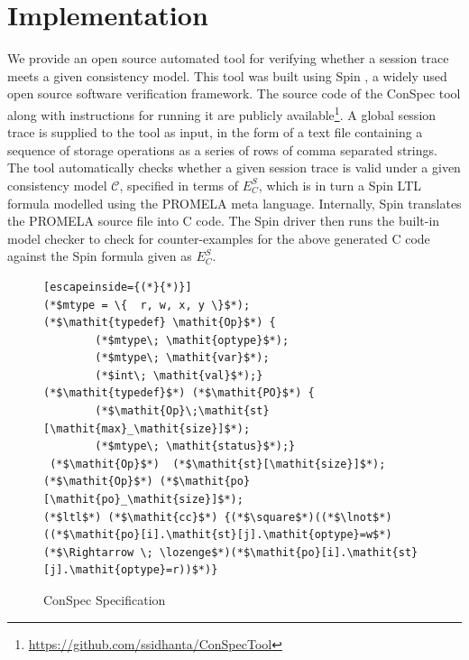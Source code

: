 \documentclass[journal,compsoc]{IEEEtran}
\begin{document}
   \section{Implementation}\label{sec:impl}
 We provide an open source automated  tool for verifying whether a session trace meets a given consistency model. This tool was built using Spin \cite{Holzmann:2003:SMC:1405716}, a widely used open source software verification framework. The source code of the ConSpec tool along with instructions for running it are publicly available\footnote{\url{https://github.com/ssidhanta/ConSpecTool}}. A global session trace is supplied to the tool as input, in the form of a text file containing a sequence of storage operations as a series of rows of comma separated strings. The tool automatically checks whether a given session trace is valid under a given consistency model $\mathcal{C}$, specified in terms of  $E^S_C$, which is in turn a Spin LTL formula modelled using the PROMELA meta language.
  Internally, Spin translates the PROMELA source file into C code. The Spin driver then runs the built-in model checker to check for counter-examples for the above generated C code  against  the Spin formula given as $E^S_C$. %
   \begin{figure}\caption{ConSpec Specification}\label{format:spec}
\begin{lstlisting}[escapeinside={(*}{*)}]
(*$mtype = \{  r, w, x, y \}$*);
(*$\mathit{typedef} \mathit{Op}$*) {
		(*$mtype\; \mathit{optype}$*);
		(*$mtype\; \mathit{var}$*);
		(*$int\; \mathit{val}$*);}
(*$\mathit{typedef}$*) (*$\mathit{PO}$*) {
		(*$\mathit{Op}\;\mathit{st}[\mathit{max}_\mathit{size}]$*);
		(*$mtype\; \mathit{status}$*);}
 (*$\mathit{Op}$*)  (*$\mathit{st}[\mathit{size}]$*);
(*$\mathit{Op}$*) (*$\mathit{po}[\mathit{po}_\mathit{size}]$*);
(*$ltl$*) (*$\mathit{cc}$*) {(*$\square$*)((*$\lnot$*)((*$\mathit{po}[i].\mathit{st}[j].\mathit{optype}=w$*) (*$\Rightarrow \; \lozenge$*)(*$\mathit{po}[i].\mathit{st}[j].\mathit{optype}=r))$*)}
\end{lstlisting}
\end{figure}
\end{document}
